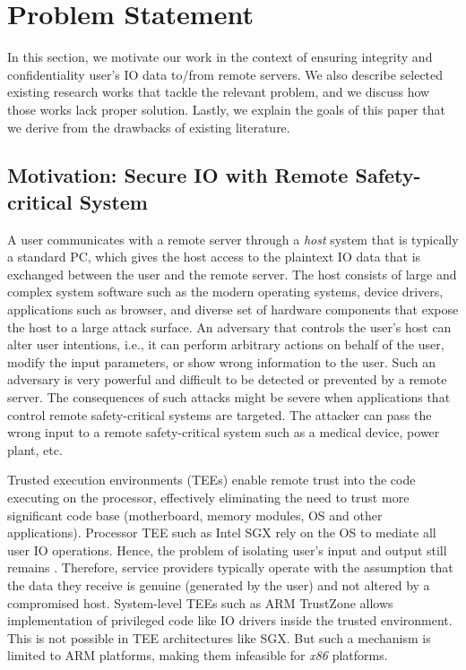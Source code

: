 \section{Problem Statement}
\label{sec:problemStatement}

In this section, we motivate our work in the context of ensuring integrity and confidentiality user's IO data to/from remote servers. We also describe selected existing research works that tackle the relevant problem, and we discuss how those works lack proper solution. Lastly, we explain the goals of this paper that we derive from the drawbacks of existing literature.

\subsection{Motivation: Secure IO with Remote Safety-critical System}

A user communicates with a remote server through a \emph{host} system that is typically a standard PC, which gives the host access to the plaintext IO data that is exchanged between the user and the remote server. The host consists of large and complex system software such as the modern operating systems, device drivers,  applications such as browser, and diverse set of hardware components that expose the host to a large attack surface. An adversary that controls the user's host can alter user intentions, i.e., it can perform arbitrary actions on behalf of the user, modify the input parameters, or show wrong information to the user. Such an adversary is very powerful and difficult to be detected or prevented by a remote server. The consequences of such attacks might be severe when applications that control remote safety-critical systems are targeted. The attacker can pass the wrong input to a remote safety-critical system such as a medical device, power plant, etc.

Trusted execution environments (TEEs) enable remote trust into the code executing on the processor, effectively eliminating the need to trust more significant code base (motherboard, memory modules, OS and other applications). Processor TEE such as Intel SGX rely on the OS to mediate all user IO operations. Hence, the problem of isolating user's input and output still remains . Therefore, service providers typically operate with the assumption that the data they receive is genuine (generated by the user) and not altered by a compromised host. System-level TEEs such as ARM TrustZone allows implementation of privileged code like IO drivers inside the trusted environment. This is not possible in TEE architectures like SGX. But such a mechanism is limited to ARM platforms, making them infeasible for \emph{x86} platforms. %



